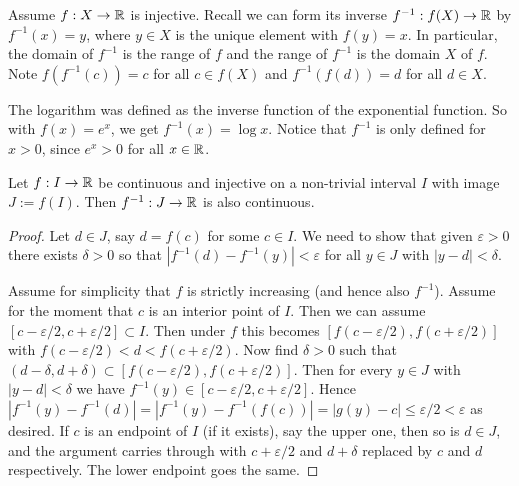\documentclass[10pt, a4paper]{article}
\begin{document}
Assume $f : X \rightarrow \mathbb{R}$ is injective.
Recall we can form its inverse $f ^ {-1} : f(X) \rightarrow \mathbb{R}$ by $f ^ {-1}(x) = y$,
where $y \in X$ is the unique element with $f(y) = x$.
In particular,
the domain of $f ^ {-1}$ is the range of $f$ and the range of $f ^ {-1}$ is the domain $X$ of $f$.
Note $f(f ^ {-1}(c)) = c$ for all $c \in f(X)$ and $f ^ {-1}(f(d)) = d$ for all $d \in X$.

\begin{example}
    The logarithm was defined as the inverse function of the exponential function.
    So with $f(x) = e ^ x$,
    we get $f ^ {-1}(x) = \log{x}$.
    Notice that $f ^ {-1}$ is only defined for $x > 0$,
    since $e ^ x > 0$ for all $x \in \mathbb{R}$.
\end{example}

\begin{theorem}\label{pre:analy:thm:imgofinvcontinjfunciscont}
    Let $f : I \rightarrow \mathbb{R}$ be continuous and injective on a non-trivial interval $I$ with image $J := f(I)$.
    Then $f ^ {-1} : J \rightarrow \mathbb{R}$ is also continuous.

    \begin{proof}
        Let $d \in J$,
        say $d = f(c)$ for some $c \in I$.
        We need to show that given $\varepsilon > 0$ there exists $\delta > 0$ so that $|f ^ {-1}(d) - f ^ {-1}(y)| < \varepsilon$ for all $y \in J$ with $|y - d| < \delta$.

        Assume for simplicity that $f$ is strictly increasing
        (and hence also $f ^ {-1}$).
        Assume for the moment that $c$ is an interior point of $I$.
        Then we can assume $[c - \varepsilon / 2, c + \varepsilon / 2] \subset I$.
        Then under $f$ this becomes $[f(c - \varepsilon / 2), f(c + \varepsilon / 2)]$ with $f(c - \varepsilon / 2) < d < f(c + \varepsilon / 2)$.
        Now find $\delta > 0$ such that $(d - \delta, d + \delta) \subset [f(c - \varepsilon / 2), f(c + \varepsilon / 2)]$.
        Then for every $y \in J$ with $|y - d| < \delta$ we have $f ^ {-1}(y) \in [c - \varepsilon / 2, c + \varepsilon / 2]$.
        Hence $|f ^ {-1}(y) - f ^ {-1}(d)| = |f ^ {-1}(y) - f ^ {-1}(f(c))| = |g(y) - c| \leq \varepsilon / 2 < \varepsilon$ as desired.
        If $c$ is an endpoint of $I$
        (if it exists),
        say the upper one,
        then so is $d \in J$,
        and the argument carries through with $c + \varepsilon / 2$ and $d + \delta$ replaced by $c$ and $d$ respectively.
        The lower endpoint goes the same.
    \end{proof}
\end{theorem}
\end{document}
